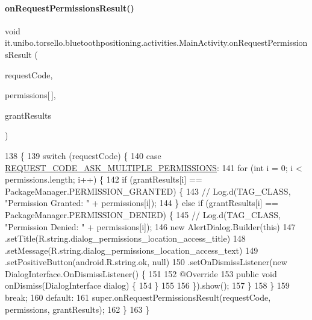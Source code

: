 \paragraph{\texorpdfstring{on\+Request\+Permissions\+Result()}{onRequestPermissionsResult()}}
{\footnotesize\ttfamily void it.\+unibo.\+torsello.\+bluetoothpositioning.\+activities.\+Main\+Activity.\+on\+Request\+Permissions\+Result (\begin{DoxyParamCaption}\item[{int}]{request\+Code,  }\item[{@Non\+Null String}]{permissions\mbox{[}$\,$\mbox{]},  }\item[{@Non\+Null int \mbox{[}$\,$\mbox{]}}]{grant\+Results }\end{DoxyParamCaption})}


\begin{DoxyCode}
138                                                                         \{
139         \textcolor{keywordflow}{switch} (requestCode) \{
140             \textcolor{keywordflow}{case} \hyperlink{classit_1_1unibo_1_1torsello_1_1bluetoothpositioning_1_1activities_1_1MainActivity_a319aed5cdd5724e043302babe5fcfeac_a319aed5cdd5724e043302babe5fcfeac}{REQUEST\_CODE\_ASK\_MULTIPLE\_PERMISSIONS}:
141                 \textcolor{keywordflow}{for} (\textcolor{keywordtype}{int} i = 0; i < permissions.length; i++) \{
142                     \textcolor{keywordflow}{if} (grantResults[i] == PackageManager.PERMISSION\_GRANTED) \{
143 \textcolor{comment}{//                        Log.d(TAG\_CLASS, "Permission Granted: " + permissions[i]);}
144                     \} \textcolor{keywordflow}{else} \textcolor{keywordflow}{if} (grantResults[i] == PackageManager.PERMISSION\_DENIED) \{
145 \textcolor{comment}{//                        Log.d(TAG\_CLASS, "Permission Denied: " + permissions[i]);}
146                         \textcolor{keyword}{new} AlertDialog.Builder(\textcolor{keyword}{this})
147                                 .setTitle(R.string.dialog\_permissions\_location\_access\_title)
148                                 .setMessage(R.string.dialog\_permissions\_location\_access\_text)
149                                 .setPositiveButton(android.R.string.ok, null)
150                                 .setOnDismissListener(\textcolor{keyword}{new} DialogInterface.OnDismissListener() \{
151 
152                                     @Override
153                                     \textcolor{keyword}{public} \textcolor{keywordtype}{void} onDismiss(DialogInterface dialog) \{
154                                     \}
155 
156                                 \}).show();
157                     \}
158                 \}
159                 \textcolor{keywordflow}{break};
160             \textcolor{keywordflow}{default}:
161                 super.onRequestPermissionsResult(requestCode, permissions, grantResults);
162         \}
163     \}
\end{DoxyCode}
